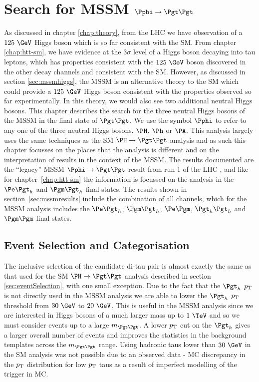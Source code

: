 \chapter{Search for \ac{MSSM} $\Pphi\to\Pgt\Pgt$}
\label{chap:httmssm}

As discussed in chapter \ref{chap:theory}, from the \ac{LHC} we have observation
of a $125~\GeV$ Higgs boson which is so far consistent with the \ac{SM}. From
chapter \ref{chap:htt-sm}, we have evidence at the $3\sigma$ level of a Higgs
boson decaying into tau leptons, which has properties consistent with the $125~\GeV$ boson
discovered in the other decay channels and consistent with the \ac{SM}.
However, as discussed in section \ref{sec:mssmhiggs}, the \ac{MSSM} is an
alternative theory to the \ac{SM} which could provide a $125~\GeV$ Higgs boson
consistent with the properties observed so far experimentally. In this theory,
we would also see two additional neutral Higgs bosons. This chapter describes
the search for the three neutral Higgs bosons of the \ac{MSSM} in the final
state of $\Pgt\Pgt$. We use the symbol $\Pphi$ to refer to any one of the three
neutral Higgs bosons, $\PH$, $\Ph$ or $\PA$. This analysis largely uses the same
techniques as the \ac{SM} $\HToTauTau$ analysis and as such this chapter focusses on the
places that the analysis is different and on the interpretation of results in
the context of the \ac{MSSM}. The results documented are the ``legacy''
\ac{MSSM} $\Pphi\to\Pgt\Pgt$ result from run 1 of the \ac{LHC} \cite{HIG-13-021}, and like for
chapter~\ref{chap:htt-sm} the information is focussed on the analysis in the
$\etau$ and $\mutau$ final states. The results shown in
section~\ref{sec:mssmresults} include the combination of all channels, which for
the \ac{MSSM} analysis includes the $\etau$, $\mutau$, $\emu$, $\tautau$ and
$\mumu$ final states. 

\section{Event Selection and Categorisation}
\label{sec:mssmEventSelection}

The inclusive selection of the candidate di-tau pair is almost exactly the same
as that used for the \ac{SM} $\HToTauTau$ analysis described in section
\ref{sec:eventSelection}, with one small exception. Due
to the fact that the $\Pgth$ $p_{\mathrm{T}}$ is not directly used in the \ac{MSSM} analysis we are
able to lower the $\Pgth$ $p_{\mathrm{T}}$ threshold from $30~\GeV$ to $20~\GeV$. This is useful
in the \ac{MSSM} analysis since we are interested in Higgs bosons of a
much larger mass up to $1~\TeV$ and so we must consider events up to a large
$m_{\Pgt\Pgt}$. A lower $p_{\mathrm{T}}$ cut on the $\Pgth$ gives a larger overall number of events
and improves the statistics in the background templates across the $m_{\Pgt\Pgt}$ range. 
Using hadronic taus lower than $30~\GeV$ in the \ac{SM} analysis was not possible 
due to an observed data - \ac{MC} discrepancy in the $p_{\mathrm{T}}$ distribution for low 
$p_{\mathrm{T}}$ taus as a result of imperfect modelling of the trigger in \ac{MC}.

